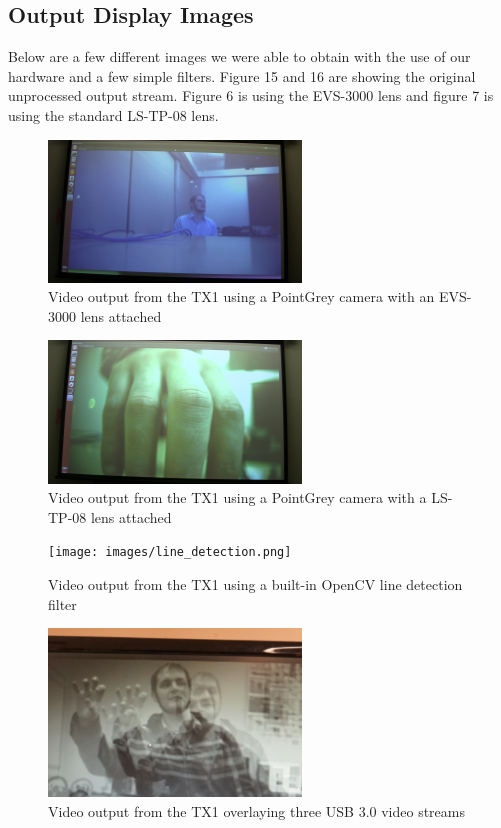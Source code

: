 \newpage
\subsection{Output Display Images}

Below are a few different images we were able to obtain with the use of our hardware and a few simple filters. Figure 15 and 16 are showing the original unprocessed output stream. Figure 6 is using the EVS-3000 lens and figure 7 is using the standard LS-TP-08 lens.\\

   \begin{figure}[!ht]
	  \centering
		    \includegraphics[width=0.6\textwidth]{images/normal_image.png}
		      \caption{Video output from the TX1 using a PointGrey camera with an EVS-3000 lens attached}
				\end{figure}
				
\begin{figure}[!ht]
	  \centering
		    \includegraphics[width=0.6\textwidth]{images/green_image.png}
		      \caption{Video output from the TX1 using a PointGrey camera with a LS-TP-08 lens attached}
				\end{figure}

\begin{figure}[!ht]
	  \centering
		    \texttt{[image: images/line\_detection.png]}
		      \caption{Video output from the TX1 using a built-in OpenCV line detection filter}
				\end{figure}
 				
\begin{figure}[!ht]
	  \centering
		    \includegraphics[width=0.6\textwidth]{images/3_normal.png}
		      \caption{Video output from the TX1 overlaying three USB 3.0 video streams}
				\end{figure}
			
